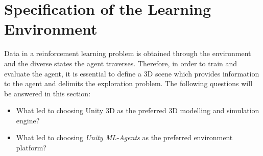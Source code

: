 \section{Specification of the Learning Environment}\label{chap:3:data}
Data in a reinforcement learning problem is obtained through the environment and the diverse states the agent traverses. Therefore, in order to train and evaluate the agent, it is essential to define a 3D scene which provides information to the agent and delimits the exploration problem.
The following questions will be answered in this section:
\begin{itemize}
    \item What led to choosing Unity 3D as the preferred 3D modelling and simulation engine?
    \item What led to choosing \textit{Unity ML-Agents} as the preferred environment platform?
    
\end{itemize}

